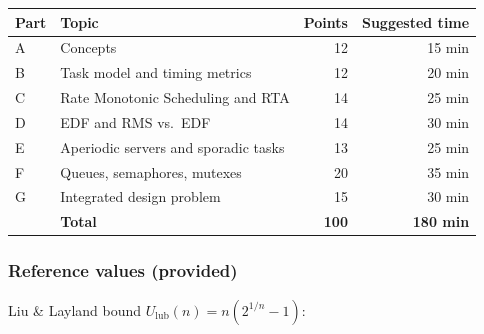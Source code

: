 \documentclass[
  11pt,
]{article}
\newcounter{none} %
\begin{document}
{\def\LTcaptype{none} %
\begin{longtable}[]{@{}llrr@{}}
\toprule\noalign{}
Part & Topic & Points & Suggested time \\
\midrule\noalign{}
\endhead
\bottomrule\noalign{}
\endlastfoot
A & Concepts & 12 & 15 min \\
B & Task model and timing metrics & 12 & 20 min \\
C & Rate Monotonic Scheduling and RTA & 14 & 25 min \\
D & EDF and RMS vs.~EDF & 14 & 30 min \\
E & Aperiodic servers and sporadic tasks & 13 & 25 min \\
F & Queues, semaphores, mutexes & 20 & 35 min \\
G & Integrated design problem & 15 & 30 min \\
& \textbf{Total} & \textbf{100} & \textbf{180 min} \\
\end{longtable}
}

\subsubsection{Reference values
(provided)}\label{reference-values-provided}

Liu \& Layland bound \(U_{\text{lub}}(n) = n\left(2^{1/n}-1\right)\):
\end{document}
